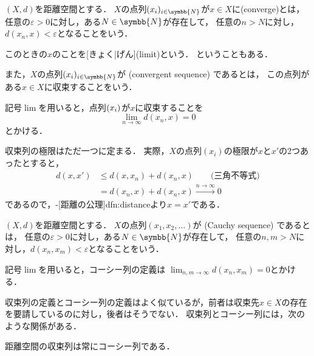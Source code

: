 \documentclass[../sotsu.tex]{subfiles}
\begin{document}
\begin{definition}[収束列]
    \label{dfn:convergent-sequence}
    $(X, d)$を距離空間とする．
    $X$の点列$\sequ{x_i}[i \in \symbb{N}]$が$x \in X$に(converge)とは，
    任意の$\varepsilon > 0$に対し，ある$N \in \symbb{N}$が存在して，
    任意の$n > N$に対し，$d(x_n, x) < \varepsilon$となることをいう．
    
    このときの$x$のことを[きょく|げん](limit)という\cite{uchida-set-2020}．
    ということもある．

    また，$X$の点列$\sequ{x_i}[i \in \symbb{N}]$が%
    (convergent sequence)%
    であるとは，
    この点列がある$x \in X$に収束することをいう．
\end{definition}

記号$\lim$を用いると，点列$\sequ{x_i}$が$x$に収束することを
\[  \lim_{n \to \infty} d(x_n, x) = 0  \]
とかける．

収束列の極限はただ一つに定まる．
実際，$X$の点列$(x_i)$の極限が$x$と$x'$の2つあったとすると，
\begin{equation*}
    \begin{split}
        d(x, x') &\leq d(x, x_n) + d(x_n, x)  \qquad \text{(三角不等式)}  \\
            &= d(x_n, x) + d(x_n, x)  
            \xrightarrow{n \to \infty} 0
    \end{split}
\end{equation*}
であるので，-[距離の公理]{dfn:distance}より$x = x'$である．


\begin{definition}[コーシー列]
    \label{dfn:Cauchy-sequence}
    $(X, d)$を距離空間とする．
    $X$の点列$(x_1, x_2, \dotsc)$が
    (Cauchy sequence)%
    であるとは，
    任意の$\varepsilon > 0$に対し，ある$N \in \symbb{N}$が存在して，
    任意の$n, m > N$に対し，$ d(x_n, x_m) < \varepsilon $となることをいう\cite{uchida-set-2020}．
\end{definition}

記号$\lim$を用いると，コーシー列の定義は
$\lim_{n, m \to \infty} d(x_n, x_m) = 0$とかける．

収束列の定義とコーシー列の定義はよく似ているが，前者は収束先$x \in X$の存在を要請しているのに対し，後者はそうでない．
収束列とコーシー列には，次のような関係がある．
\begin{theorem}
    \label{thm:convergent-is-Cauchy}
    距離空間の収束列は常にコーシー列である．
\end{theorem}
\end{document}
